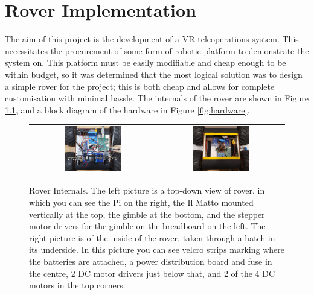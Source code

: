 \chapter{Rover Implementation}
\label{chapter:rover}

The aim of this project is the development of a VR teleoperations system. This necessitates the procurement of some form of robotic platform to demonstrate the system on. This platform must be easily modifiable and cheap enough to be within budget, so it was determined that the most logical solution was to design a simple rover for the project; this is both cheap and allows for complete customisation with minimal hassle. The internals of the rover are shown in Figure \ref{fig:internals}, and a block diagram of the hardware in Figure \ref{fig:hardware}.

\begin{figure}[H]
    \begin{center}
    \begin{tabular}{ c c }
        \includegraphics[width=0.47\textwidth]{Figures/rovertop.jpg} &
        \includegraphics[width=0.47\textwidth]{Figures/roverinside.jpg}
    \end{tabular}
    \caption[Rover Internals]{Rover Internals. The left picture is a top-down view of rover, in which you can see the Pi on the right, the Il Matto mounted vertically at the top, the gimble at the bottom, and the stepper motor drivers for the gimble on the breadboard on the left. The right picture is of the inside of the rover, taken through a hatch in its underside. In this picture you can see velcro strips marking where the batteries are attached, a power distribution board and fuse in the centre, 2 DC motor drivers just below that, and 2 of the 4 DC motors in the top corners.}
    \label{fig:internals}
    \end{center}
\end{figure}

